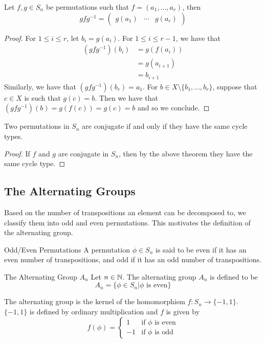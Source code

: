 \documentclass[a4paper]{article}
\begin{document}
\begin{prp}{}{} Let $f,g\in S_n$ be permutations such that $f=(a_1,\dots,a_r)$, then $$gfg^{-1}=\begin{pmatrix}g(a_1) & \cdots & g(a_r)\end{pmatrix}$$ \tcbline
\begin{proof}
For $1\leq i\leq r$, let $b_i=g(a_i)$. For $1\leq i\leq r-1$, we have that 
\begin{align*}
(gfg^{-1})(b_i)&=g(f(a_i))\\
&=g(a_{i+1})\\
&=b_{i+1}
\end{align*}
Similarly, we have that $(gfg^{-1})(b_r)=a_1$. For $b\in X\setminus\{b_1,\dots,b_r\}$, suppose that $c\in X$ is such that $g(c)=b$. Then we have that $(gfg^{-1})(b)=g(f(c))=g(c)=b$ and so we conclude. 
\end{proof}
\end{prp}

\begin{prp}{}{} Two permutations in $S_n$ are conjugate if and only if they have the same cycle types. \tcbline
\begin{proof}
If $f$ and $g$ are conjugate in $S_n$, then by the above theorem they have the same cycle type. 
\end{proof}
\end{prp}

\subsection{The Alternating Groups}
Based on the number of transpositions an element can be decomposed to, we classify them into odd and even permutations. This motivates the definition of the alternating group. 

\begin{defn}{Odd/Even Permutations}{} A permutation $\phi\in S_n$ is said to be even if it has an even number of transpositions, and odd if it has an odd number of transpositions. 
\end{defn}

\begin{defn}{The Alternating Group $A_n$}{} Let $n\in\mathbb{N}$. The alternating group $A_n$ is defined to be $$A_n=\{\phi\in S_n|\phi\text{ is even}\}$$
\end{defn}

\begin{thm}{}{} The alternating group is the kernel of the homomorphism $f:S_n\to\{-1,1\}$. $\{-1,1\}$ is defined by ordinary multiplication and $f$ is given by $$f(\phi)=\begin{cases}
1 & \text{if $\phi$ is even}\\
-1 & \text{if $\phi$ is odd}
\end{cases}$$
\end{thm}
\end{document}
